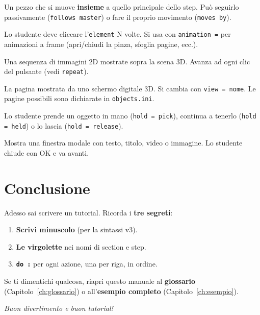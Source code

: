 ﻿\documentclass[a4paper,12pt,oneside]{book}
\newcommand{\kw}[1]{\texttt{\color{keycolor}#1}}
\newcommand{\val}[1]{\texttt{\color{cvtgreen}#1}}
\newcommand{\file}[1]{\texttt{#1}}
\begin{document}
\begin{description}[leftmargin=2.5cm,style=nextline]
\item[\textbf{Companion}]
Un pezzo che si muove \textbf{insieme} a quello principale dello step. Può
seguirlo passivamente (\val{follows master}) o fare il proprio movimento
(\val{moves by}).

\item[\textbf{Repeat N} (in \texttt{element = X repeat N})]
Lo studente deve cliccare l'\kw{element} N volte. Si usa con \kw{animation =}
per animazioni a frame (apri/chiudi la pinza, sfoglia pagine, ecc.).

\item[\textbf{Animation}]
Una sequenza di immagini 2D mostrate sopra la scena 3D. Avanza ad ogni clic
del pulsante (vedi \val{repeat}).

\item[\textbf{View} (vista di un display)]
La pagina mostrata da uno schermo digitale 3D. Si cambia con \kw{view = nome}.
Le pagine possibili sono dichiarate in \file{objects.ini}.

\item[\textbf{Hold}]
Lo studente prende un oggetto in mano (\val{hold = pick}), continua a tenerlo
(\val{hold = held}) o lo lascia (\val{hold = release}).

\item[\textbf{Message / Title / Video / Image}]
Mostra una finestra modale con testo, titolo, video o immagine. Lo studente
chiude con OK e va avanti.

\end{description}

\chapter*{Conclusione}

Adesso sai scrivere un tutorial. Ricorda i \textbf{tre segreti}:

\begin{enumerate}
  \item \textbf{Scrivi minuscolo} (per la sintassi v3).
  \item \textbf{Le virgolette} nei nomi di section e step.
  \item \textbf{\kw{do :}} per ogni azione, una per riga, in ordine.
\end{enumerate}

Se ti dimentichi qualcosa, riapri questo manuale al \textbf{glossario}
(Capitolo~\ref{ch:glossario}) o all'\textbf{esempio completo}
(Capitolo~\ref{ch:esempio}).

\vfill
\begin{center}
\textit{\Large Buon divertimento e buon tutorial!}
\end{center}
\end{document}
